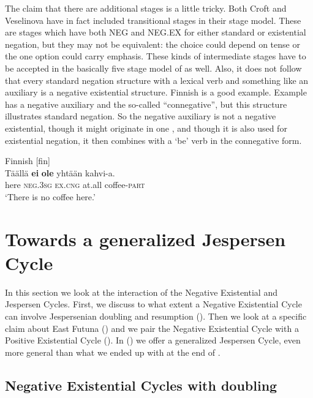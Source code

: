 ﻿\documentclass[output=paper]{langsci/langscibook}
\begin{document}
The claim that there are additional stages is a little tricky. Both Croft
and Veselinova have in fact included transitional stages in their stage
model. These are stages which have both NEG and NEG.EX for either standard
or existential negation, but they may not be equivalent: the choice could
depend on tense or the one option could carry emphasis. These kinds of
intermediate stages have to be accepted in the basically five stage model
of  as well. Also, it does not follow that every standard
negation structure with a lexical verb and something like an auxiliary is a
negative existential structure. Finnish is a good example. Example
 has a negative auxiliary and the so-called ``connegative'',
but this structure illustrates standard negation. So the negative auxiliary
is not a negative existential, though it might originate in one
\parencite[see][577 for references]{Veselinova2015}, and though it is also
used
for existential negation, it then combines with a `be' verb in the
connegative form.
%
\begin{exe}\ex\label{ex:int-finnish-kahvi}
          Finnish [fin] \\
    \gll Täällä  \textbf{ei}    \textbf{ole}    yhtään   kahvi-a.  \\
  here  \textsc{neg.3sg}  \textsc{ex.cng}  at.all    coffee-\textsc{part} \\
    \glt `There is no coffee here.'
    \end{exe} 

\section{Towards a generalized Jespersen Cycle}\label{sec:int-4}

In this section we look at the interaction of the Negative Existential and
Jespersen Cycles. First, we discuss to what extent a Negative Existential
Cycle can involve Jespersenian doubling and resumption
(). Then we look
at a specific claim about East Futuna () and we pair the Negative
Existential Cycle with a Positive Existential Cycle
(). In () we
offer a generalized Jespersen Cycle, even more general than what we ended
up with at the end of .

\subsection{Negative Existential Cycles with doubling}\label{sec:int-4.1}
\end{document}
